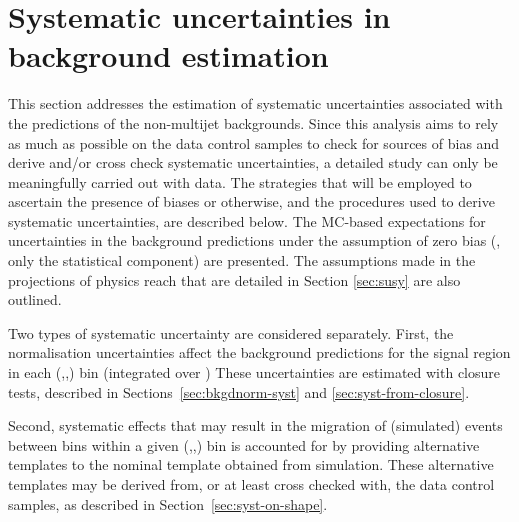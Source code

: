 \section{Systematic uncertainties in background estimation}
\label{sec:systematics}

This section addresses the estimation of systematic uncertainties
associated with the predictions of the non-multijet backgrounds. Since
this analysis aims to rely as much as possible on the data control
samples to check for sources of bias and derive and/or cross check
systematic uncertainties, a detailed study can only be meaningfully
carried out with data. The strategies that will be employed to
ascertain the presence of biases or otherwise, and the procedures used
to derive systematic uncertainties, are described below. The MC-based
expectations for uncertainties in the background predictions under the
assumption of zero bias (\ie, only the statistical component) are
presented. The assumptions made in the projections of physics reach
that are detailed in Section \ref{sec:susy} are also outlined.

Two types of systematic uncertainty are considered separately. First,
the normalisation uncertainties affect the background predictions for
the signal region in each (\nb,\njet,\HT) bin (integrated over \mht)
These uncertainties are estimated with closure tests, described in
Sections~\ref{sec:bkgdnorm-syst} and \ref{sec:syst-from-closure}.

Second, systematic effects that may result in the migration of
(simulated) events between \mht bins within a given (\njet,\nb,\HT)
bin is accounted for by providing alternative templates to the nominal
\mht template obtained from simulation. These alternative \mht
templates may be derived from, or at least cross checked with, the
data control samples, as described in Section~\ref{sec:syst-on-shape}.

%


